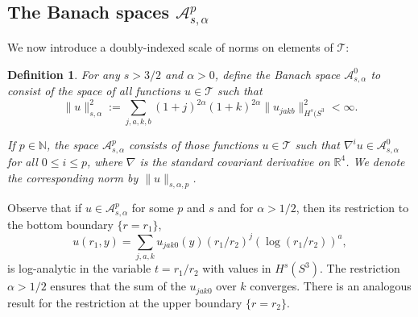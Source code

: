 \documentclass[12pt]{article}
\newtheorem{defn}[thm]{Definition}
\newcommand{\NN}{\mathbb N}
\newcommand{\RR}{\mathbb R}
\newcommand{\calA}{{\mathcal A}}
\newcommand{\calT}{{\mathcal T}}
\begin{document}


\subsection{The Banach spaces $\calA^p_{s,\alpha}$}
We now introduce a doubly-indexed scale of norms on elements of $\calT$: 
\begin{defn}
For any $s > 3/2$ and $\alpha > 0$, define the Banach space $\calA_{s,\alpha}^0$ to consist of 
the space of all functions $u \in \calT$ such that
\[
\|u\|_{s,\alpha}^2:= \sum_{j,a, k, b} (1+j)^{2\alpha}(1+k)^{2\alpha} \|u_{j a k b}\|_{H^s(S^3}^2 < \infty. 
\]

If $p \in \NN$, the space $\calA^p_{s,\alpha}$ consists of those functions $u \in \calT$ such that 
$\nabla^i u \in \calA^0_{s,\alpha}$ for all $0 \leq i \leq p$, where $\nabla$ is the standard covariant derivative 
on $\RR^4$. We denote the corresponding norm by $\|u\|_{s,\alpha,p}$. 
\label{norms}
\end{defn}

Observe that if $u \in \calA^p_{s,\alpha}$ for some $p$ and $s$ and for $\alpha > 1/2$, then its restriction to the bottom boundary 
$\{r =r_1\}$, 
\[
u(r_1,y)=\sum_{j, a, k} u_{j a k 0}(y)  (r_1/r_2)^j ( \log (r_1/r_2) )^a,
\]
is log-analytic in the variable $t = r_1/r_2$ with values in  $H^s(S^3)$.  The restriction $\alpha > 1/2$ ensures that
the sum of the $u_{j a k 0}$ over $k$ converges.  There is an analogous result for the restriction at the upper boundary $\{r = r_2\}$. 
\end{document}
